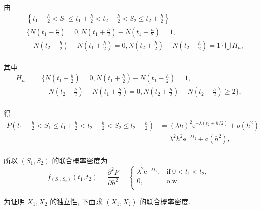 \documentclass[openany]{ctexbook}
\theoremstyle{kaiti}
\theoremstyle{normal}
\begin{document}
  由
\begin{equation}
    \begin{aligned}
      &~\left\{t_1-\frac{h}{2}< S_1 \leqslant t_1+\frac{h}{2} < t_2-\frac{h}{2} < S_2 \leqslant t_2+\frac{h}{2}\right\}\\
      =&~\bigg\{N\left(t_1-\frac{h}{2}\right)=0,N\left(t_1+\frac{h}{2}\right)-N\left(t_1-\frac{h}{2}\right)=1,\\
      &\quad~N\left(t_2-\frac{h}{2}\right)-N\left(t_1+\frac{h}{2}\right)=0,N\left(t_2+\frac{h}{2}\right)-N\left(t_2-\frac{h}{2}\right)=1\bigg\}\bigcup H_n,\\
    \end{aligned}
\end{equation}
  
  其中
\begin{equation}
    \begin{aligned}
      H_n=&~\bigg\{N\left(t_1-\frac{h}{2}\right)=0,N\left(t_1+\frac{h}{2}\right)-N\left(t_1-\frac{h}{2}\right)=1,\\
      &\quad~N\left(t_2-\frac{h}{2}\right)-N\left(t_1+\frac{h}{2}\right)=0,N\left(t_2+\frac{h}{2}\right)-N\left(t_2-\frac{h}{2}\right)\geqslant2\bigg\},\\
    \end{aligned}
\end{equation}
  
  得
\begin{equation}
    \begin{aligned}
      P\left(t_1-\frac{h}{2}< S_1 \leqslant t_1 + \frac{h}{2} < t_2-\frac{h}{2} < S_2 \leqslant t_2 + \frac{h}{2}\right)
      &=(\lambda h)^2\mathrm{e}^{-\lambda(t_2+h/2)}+o(h^2)\\
      &=\lambda^2h^2\mathrm{e}^{-\lambda t_2}+o(h^2),\\
    \end{aligned}
\end{equation}
  
  所以 $(S_1,S_2)$ 的联合概率密度为
\begin{equation}
    f_{(S_1,S_2)}(t_1,t_2)=\frac{\partial^2 P}{\partial h^2}=
    \begin{cases}
      \lambda^2\mathrm{e}^{-\lambda t_2}, &\text{if}~0< t_1 < t_2,\\
      0, &\text{o.w.}\\
    \end{cases}
\end{equation}
  
  为证明 $X_1,X_2$ 的独立性, 下面求 $(X_1,X_2)$ 的联合概率密度. 
  
\end{document}
